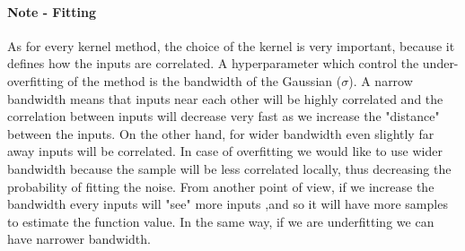 \documentclass[../main.tex]{subfiles}
\begin{document}
\paragraph{Note - Fitting} As for every kernel method, the choice of the kernel is very important, because it defines how the inputs are correlated. A hyperparameter which control the under-overfitting of the method is the bandwidth of the Gaussian ($\sigma$). A narrow bandwidth means that inputs near each other will be highly correlated and the correlation between inputs will decrease very fast as we increase the "distance" between the inputs. On the other hand, for wider bandwidth even slightly far away inputs will be correlated. In case of overfitting we would like to use wider bandwidth because the sample will be less correlated locally, thus decreasing the probability of fitting the noise. From another point of view, if we increase the bandwidth every inputs will "see" more inputs ,and so it will have more samples to estimate the function value. In the same way, if we are underfitting we can have narrower bandwidth.
\end{document}
